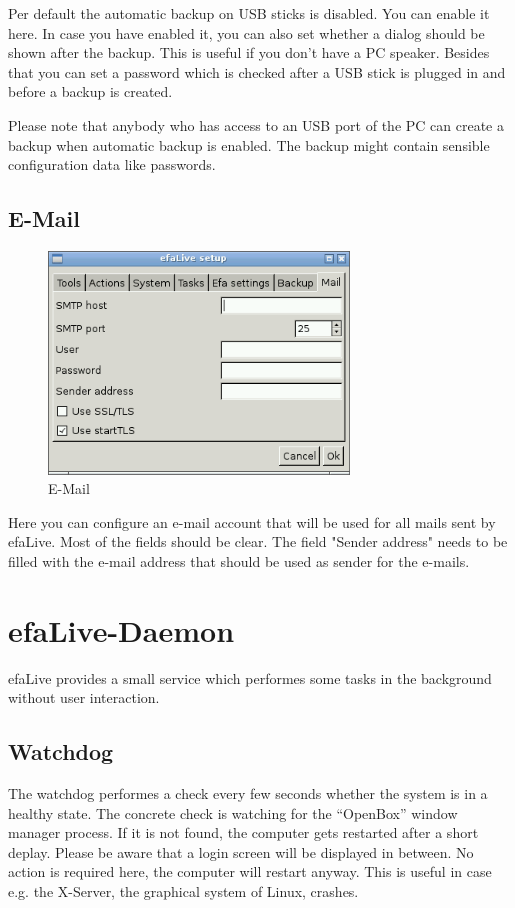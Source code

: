 \documentclass[a4paper,12pt,twoside]{article}
\begin{document}
Per default the automatic backup on USB sticks is disabled. You can
enable it here. In case you have enabled it, you can also set whether a
dialog should be shown after the backup. This is useful if you
don't have a PC speaker. Besides that you can set a password which is
checked after a USB stick is plugged in and before a backup is created.

Please note that anybody who has access to an USB port of the PC can
create a backup when automatic backup is enabled. The backup might
contain sensible configuration data like passwords.


\subsection{E-Mail}
\label{sct:efalivesetup_email}

\begin{figure}
    \centering
    \includegraphics[width=8cm]{screenshots/efalive_setup_email.png}
    \caption{E-Mail}
    \label{fig:efalivesetup_email}
\end{figure}

Here you can configure an e-mail account that will be used for all mails
sent by efaLive. Most of the fields should be clear. The field "Sender address"
needs to be filled with the e-mail address that should be used as sender
for the e-mails.


\section{efaLive-Daemon}
\label{sct:efalivedaemon}
efaLive provides a small service which performes some tasks
in the background without user interaction.


\subsection{Watchdog}
\label{sct:watchdog}
The watchdog performes a check every few seconds whether the system is in
a healthy state. The concrete check is watching for the "`OpenBox"' window
manager process. If it is not found, the computer gets restarted after a 
short deplay. Please be
aware that a login screen will be displayed in between. No action is
required here, the computer will restart anyway.
This is useful in case e.g. the X-Server, the graphical system of Linux,
crashes.
\end{document}
